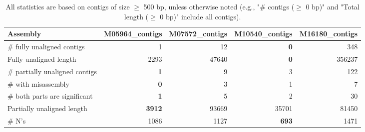 \documentclass[12pt,a4paper]{article}
\begin{document}
\begin{table}[ht]
\begin{center}
\caption{All statistics are based on contigs of size $\geq$ 500 bp, unless otherwise noted (e.g., "\# contigs ($\geq$ 0 bp)" and "Total length ($\geq$ 0 bp)" include all contigs).}
\begin{tabular}{|l*{4}{|r}|}
\hline
Assembly & M05964\_contigs & M07572\_contigs & M10540\_contigs & M16180\_contigs \\ \hline
\# fully unaligned contigs & 1 & 12 & {\bf 0} & 348 \\ \hline
Fully unaligned length & 2293 & 47640 & {\bf 0} & 356237 \\ \hline
\# partially unaligned contigs & {\bf 1} & 9 & 3 & 122 \\ \hline
\hspace{5mm}\# with misassembly & {\bf 0} & 3 & 1 & 7 \\ \hline
\hspace{5mm}\# both parts are significant & {\bf 1} & 5 & 2 & 30 \\ \hline
Partially unaligned length & {\bf 3912} & 93669 & 35701 & 81450 \\ \hline
\# N's & 1086 & 1127 & {\bf 693} & 1471 \\ \hline
\end{tabular}
\end{center}
\end{table}
\end{document}
